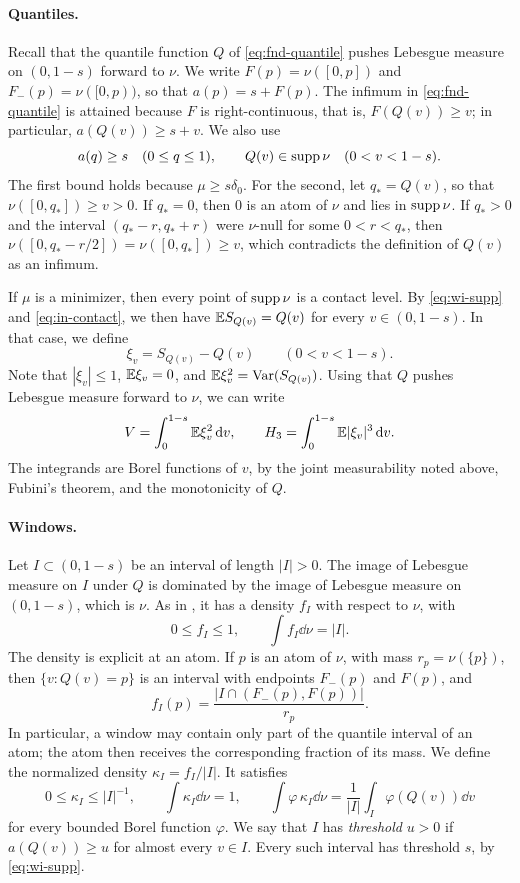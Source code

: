 \paragraph{Quantiles.}
Recall that the quantile function $Q$ of \eqref{eq:fnd-quantile} pushes
Lebesgue measure on $(0,1-s)$ forward to $\nu$. We write
$F(p)=\nu([0,p])$ and $F_-(p)=\nu([0,p))$, so that $a(p)=s+F(p)$. The
infimum in \eqref{eq:fnd-quantile} is attained because $F$ is
right-continuous, that is, $F(Q(v))\ge v$; in particular, $a(Q(v))\ge s+v$. We
also use
\begin{equation}\label{eq:wi-supp}
 a(q)\ge s\quad(0\le q\le1),\qquad
 Q(v)\in\operatorname{supp}\nu\quad(0<v<1-s).
\end{equation}
The first bound holds because $\mu\ge s\delta_0$. For the second, let
$q_*=Q(v)$, so that $\nu([0,q_*])\ge v>0$. If $q_*=0$, then $0$ is an
atom of $\nu$ and lies in $\operatorname{supp}\nu$. If $q_*>0$ and the interval
$(q_*-r,q_*+r)$ were $\nu$-null for some $0<r<q_*$, then
$\nu([0,q_*-r/2])=\nu([0,q_*])\ge v$, which contradicts the definition
of $Q(v)$ as an infimum.

If $\mu$ is a minimizer, then every point of $\operatorname{supp}\nu$ is a contact
level. By \eqref{eq:wi-supp} and \eqref{eq:in-contact}, we then have
$\mathbb E S_{Q(v)}=Q(v)$ for every $v\in(0,1-s)$. In that case, we define
\[
 \xi_v=S_{Q(v)}-Q(v)\qquad(0<v<1-s).
\]
Note that $|\xi_v|\le1$, $\mathbb E\xi_v=0$, and $\mathbb E\xi_v^2=\operatorname{Var}(S_{Q(v)})$. Using
that $Q$ pushes Lebesgue measure forward to $\nu$, we can write
\[
 V=\int_0^{1-s}\mathbb E\xi_v^2\,\mathrm d v,\qquad
 H_3=\int_0^{1-s}\mathbb E|\xi_v|^3\,\mathrm d v .
\]
The integrands are Borel functions of $v$, by the joint measurability
noted above, Fubini's theorem, and the monotonicity of $Q$.

\paragraph{Windows.}
Let $I\subset(0,1-s)$ be an interval of length $|I|>0$. The image of
Lebesgue measure on $I$ under $Q$ is dominated by the image of Lebesgue
measure on $(0,1-s)$, which is $\nu$. As in \cite[Section~3]{AL}, it
has a density $f_I$ with respect to $\nu$, with
\[
 0\le f_I\le1,\qquad \int f_I\dd\nu=|I| .
\]
The density is explicit at an atom. If $p$ is an atom of $\nu$, with
mass $r_p=\nu(\{p\})$, then $\{v:Q(v)=p\}$ is an interval with
endpoints $F_-(p)$ and $F(p)$, and
\[
 f_I(p)=\frac{|I\cap(F_-(p),F(p))|}{r_p}.
\]
In particular, a window may contain only part of the quantile interval
of an atom; the atom then receives the corresponding fraction of its
mass. We define the normalized density $\kappa_I=f_I/|I|$. It satisfies
\[
 0\le\kappa_I\le|I|^{-1},\qquad \int\kappa_I\dd\nu=1,\qquad
 \int\varphi\,\kappa_I\dd\nu=\frac1{|I|}\int_I\varphi(Q(v))\dd v
\]
for every bounded Borel function $\varphi$. We say that $I$ has
\emph{threshold} $u>0$ if $a(Q(v))\ge u$ for almost every $v\in I$. Every
such interval has threshold $s$, by \eqref{eq:wi-supp}.

